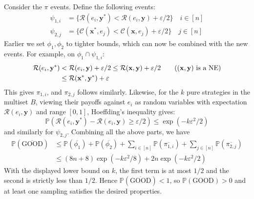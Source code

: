 Consider the $\pi$ events. Define the following events:
\begin{align*}
  \psi_{1, i} & = \{ \mathcal{R}(e_i, \mathbf{y}^*) < \mathcal{R}(e_i, \mathbf{y}) + \varepsilon / 2 \} \quad i \in [n] \\
  \psi_{2, j} & = \{ \mathcal{C}(\mathbf{x}^*, e_j) < \mathcal{C}(\mathbf{x}, e_j) + \varepsilon / 2 \} \quad j \in [n]
\end{align*}
Earlier we set $\phi_1, \phi_2$ to tighter bounds, which can now be combined with the new events. For example, on $\phi_1 \cap \psi_{1, i}$:
\begin{align*}
  \mathcal{R}(e_i, \mathbf{y}^*) & < \mathcal{R}(e_i, \mathbf{y}) + \varepsilon / 2 \le \mathcal{R}(\mathbf{x}, \mathbf{y}) + \varepsilon / 2 \tag{$(\mathbf{x}, \mathbf{y})$ is a NE} \\
                                 & \le \mathcal{R}(\mathbf{x}^*, \mathbf{y}^*) + \varepsilon
\end{align*}
This gives $\pi_{1, i}$, and $\pi_{2, j}$ follows similarly. Likewise, for the $k$ pure strategies in the multiset $B$, viewing their payoffs against $e_i$ as random variables with expectation $\mathcal{R}(e_i, \mathbf{y})$ and range $[0, 1]$, Hoeffding's inequality gives:
\[
  \mathbb{P}(\mathcal{R}(e_i, \mathbf{y}^*) - \mathcal{R}(e_i, \mathbf{y}) \ge \varepsilon / 2) \le \exp(-k\varepsilon^2 / 2)
\]
and similarly for $\psi_{2, j}$. Combining all the above parts, we have
\begin{align*}
  \mathbb{P}(\overline{\text{GOOD}}) & \le \mathbb{P}(\overline{\phi_1}) + \mathbb{P}(\overline{\phi_2}) + \sum_{i \in [n]} \mathbb{P}(\overline{\pi_{1, i}}) + \sum_{j \in [n]} \mathbb{P}(\overline{\pi_{2, j}}) \\
                                     & \le (8n + 8) \exp(-k\varepsilon^2 / 8) + 2n \exp(-k\varepsilon^2 / 2)
\end{align*}
With the displayed lower bound on $k$, the first term is at most $1/2$ and the second is strictly less than $1/2$. Hence $\mathbb{P}(\overline{\text{GOOD}}) < 1$, so $\mathbb{P}(\text{GOOD}) > 0$ and at least one sampling satisfies the desired properties.
